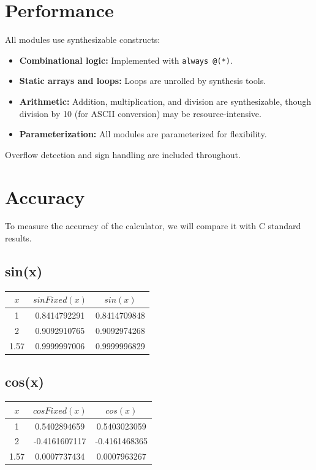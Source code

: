 \documentclass[conference]{IEEEtran}
\begin{document}
\begin{FlushLeft}
\section{Performance}
All modules use synthesizable constructs:
\begin{itemize}
    \item \textbf{Combinational logic:} Implemented with \texttt{always @(*)}.
    \item \textbf{Static arrays and loops:} Loops are unrolled by synthesis tools.
    \item \textbf{Arithmetic:} Addition, multiplication, and division are synthesizable, though division by 10 (for ASCII conversion) may be resource-intensive.
    \item \textbf{Parameterization:} All modules are parameterized for flexibility.
\end{itemize}
Overflow detection and sign handling are included throughout.\\
\section{Accuracy}
To measure the accuracy of the calculator, we will compare it with C standard results.
\subsection{sin(x)}
\begin{table}[h!]
\centering
\begin{tabular}{|c|c|c|}
\hline
$x$ & $sinFixed(x)$ & $sin(x)$ \\
\hline
1    & 0.8414792291   & 0.8414709848 \\
2    & 0.9092910765   & 0.9092974268 \\
1.57 & 0.9999997006   & 0.9999996829 \\
\hline
\end{tabular}
\end{table}
\bigskip
\bigskip

\subsection{cos(x)}
\begin{table}[h!]
\centering
\begin{tabular}{|c|c|c|}
\hline
$x$ & $cosFixed(x)$ & $cos(x)$ \\
\hline
1    & 0.5402894659    & 0.5403023059 \\
2    & -0.4161607117   & -0.4161468365 \\
1.57 & 0.0007737434    & 0.0007963267 \\
\hline
\end{tabular}
\end{table}

\end{FlushLeft}
\end{document}

